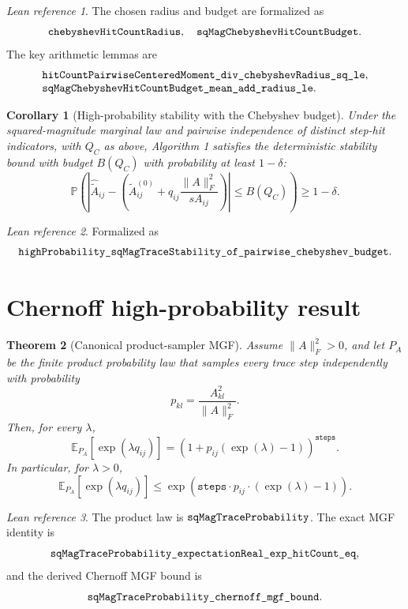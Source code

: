 \documentclass[11pt]{article}
\newcommand{\Frob}[1]{\lVert #1\rVert_F}
\newcommand{\Prob}{\mathbb{P}}
\newcommand{\E}{\mathbb{E}}
\newcommand{\lean}[1]{\texttt{\detokenize{#1}}}
\newtheorem{theorem}{Theorem}
\newtheorem{corollary}[theorem]{Corollary}
\theoremstyle{definition}
\theoremstyle{remark}
\newtheorem*{leanref}{Lean reference}
\begin{document}
\begin{leanref}
The chosen radius and budget are formalized as
\[
  \lean{chebyshevHitCountRadius},
  \quad
  \lean{sqMagChebyshevHitCountBudget}.
\]
The key arithmetic lemmas are
\[
\begin{array}{l}
  \lean{hitCountPairwiseCenteredMoment_div_chebyshevRadius_sq_le},\\
  \lean{sqMagChebyshevHitCountBudget_mean_add_radius_le}.
\end{array}
\]
\end{leanref}

\begin{corollary}[High-probability stability with the Chebyshev budget]
Under the squared-magnitude marginal law and pairwise independence of distinct
step-hit indicators, with \(Q_C\) as above, Algorithm 1 satisfies the
deterministic stability bound with budget \(B(Q_C)\) with probability at least
\(1-\delta\):
\[
  \Prob\left(
    \left|
      \widehat{\widetilde A}_{ij}
      -
      \left(
        \widetilde A^{(0)}_{ij}
        +
        q_{ij}\frac{\Frob{A}^2}{s A_{ij}}
      \right)
    \right|
    \le B(Q_C)
  \right)
  \ge 1-\delta.
\]
\end{corollary}

\begin{leanref}
Formalized as
\[
  \lean{highProbability_sqMagTraceStability_of_pairwise_chebyshev_budget}.
\]
\end{leanref}

\section*{Chernoff high-probability result}

\begin{theorem}[Canonical product-sampler MGF]
Assume \(\Frob{A}^2>0\), and let \(P_A\) be the finite product probability
law that samples every trace step independently with probability
\[
  p_{kl}=\frac{A_{kl}^2}{\Frob{A}^2}.
\]
Then, for every \(\lambda\),
\[
  \E_{P_A}[\exp(\lambda q_{ij})]
  =
  \left(1+p_{ij}(\exp(\lambda)-1)\right)^{\texttt{steps}}.
\]
In particular, for \(\lambda>0\),
\[
  \E_{P_A}[\exp(\lambda q_{ij})]
  \le
  \exp\left(
    \texttt{steps}\cdot p_{ij}\cdot(\exp(\lambda)-1)
  \right).
\]
\end{theorem}

\begin{leanref}
The product law is \(\lean{sqMagTraceProbability}\). The exact MGF identity is
\[
  \lean{sqMagTraceProbability_expectationReal_exp_hitCount_eq},
\]
and the derived Chernoff MGF bound is
\[
  \lean{sqMagTraceProbability_chernoff_mgf_bound}.
\]
\end{leanref}
\end{document}
